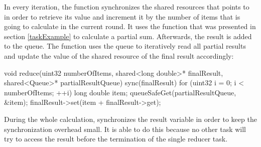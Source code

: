 In every iteration, the function synchronizes the shared resources that  points to in order to retrieve its value and increment it by the number of items that  is going to calculate in the current round. It uses the  function that was presented in section \ref{taskExample} to calculate a partial sum. Afterwards, the result is added to the queue. 
The  function uses the queue to iteratively read all partial results and update the value of the shared resource of the final result accordingly:
\begin{ccode}
void reduce(uint32 numberOfItems, shared<long double>* finalResult, shared<Queue>* partialResultQueue) {
  sync(finalResult) { 
    for (uint32 i = 0; i < numberOfItems; ++i) { 
      long double item; 
      queueSafeGet(partialResultQueue, &item); 
      finalResult->set(item + finalResult->get); 
    }
  }
}
\end{ccode}
During the whole calculation,  synchronizes the result variable in order to keep the synchronization overhead small. It is able to do this because no other task will try to access the result before the termination of the single reducer task.

